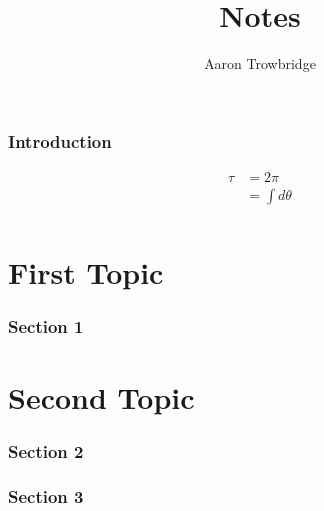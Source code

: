\documentclass{article}
\title{Notes}
\author{Aaron Trowbridge}
\date{}
\begin{document}
\maketitle

\tableofcontents
\newpage
{}

\section{Introduction}

\begin{align*}
 \tau &= 2\pi \\ 
      &= \int d\theta \\
\end{align*}

\newpage
\part{First Topic}
\section{Section 1}

\newpage
\part{Second Topic}
\section{Section 2}
\section{Section 3}

    
\end{document}
